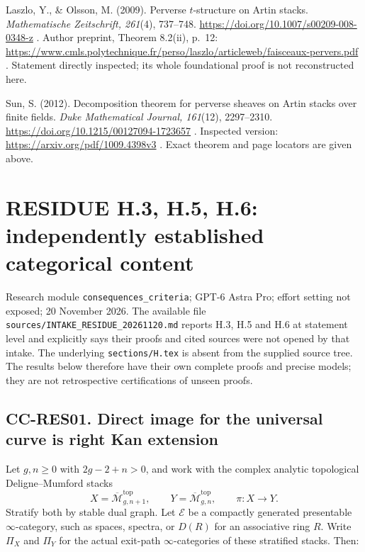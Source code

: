 \documentclass[11pt,a4paper]{article}
\theoremstyle{definition}\newtheorem{definition}[theorem]{Definition}
\theoremstyle{remark}\newtheorem{remark}[theorem]{Remark}
\begin{document}
Laszlo, Y., \& Olsson, M. (2009). Perverse \(t\)-structure on Artin
stacks. \emph{Mathematische Zeitschrift, 261}(4), 737--748.
\url{https://doi.org/10.1007/s00209-008-0348-z} . Author preprint, Theorem
8.2(ii), p.~12:
\url{https://www.cmls.polytechnique.fr/perso/laszlo/articleweb/faisceaux-pervers.pdf}
. Statement directly inspected; its whole foundational proof is not
reconstructed here.

Sun, S. (2012). Decomposition theorem for perverse sheaves on Artin
stacks over finite fields. \emph{Duke Mathematical Journal, 161}(12),
2297--2310. \url{https://doi.org/10.1215/00127094-1723657} . Inspected
version: \url{https://arxiv.org/pdf/1009.4398v3} . Exact theorem and page
locators are given above.


\section{RESIDUE H.3, H.5, H.6: independently established categorical
content}\label{residue-h.3-h.5-h.6-independently-established-categorical-content}

Research module \nolinkurl{consequences_criteria}; GPT-6 Astra Pro; effort
setting not exposed; 20 November 2026. The available file
\texttt{sources/INTAKE\_RESIDUE\_20261120.md} reports H.3, H.5 and H.6
at statement level and explicitly says their proofs and cited sources
were not opened by that intake. The underlying \texttt{sections/H.tex}
is absent from the supplied source tree. The results below therefore
have their own complete proofs and precise models; they are not
retrospective certifications of unseen proofs.

\subsection{CC-RES01. Direct image for the universal curve is right Kan
extension}\label{cc-res01.-direct-image-for-the-universal-curve-is-right-kan-extension}

Let \(g,n\geq0\) with \(2g-2+n>0\), and work with the complex analytic
topological Deligne--Mumford stacks \[
X=\overline{\mathcal M}_{g,n+1}^{\mathrm{top}},\qquad
Y=\overline{\mathcal M}_{g,n}^{\mathrm{top}},\qquad
\pi:X\longrightarrow Y.
\] Stratify both by stable dual graph. Let \(\mathcal E\) be a compactly
generated presentable \(\infty\)-category, such as spaces, spectra, or
\(D(R)\) for an associative ring \(R\). Write \(\Pi_X\) and \(\Pi_Y\)
for the actual exit-path \(\infty\)-categories of these stratified
stacks. Then:
\end{document}
